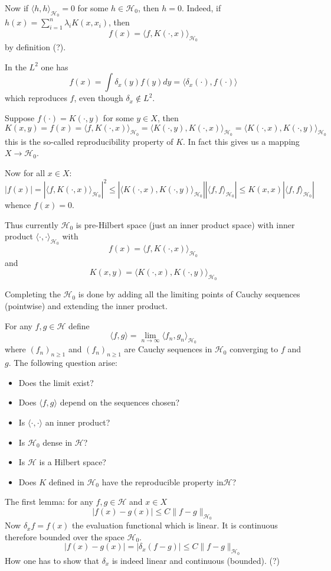 \documentclass[a4paper]{article}
\newcommand{\Hcal}{\mathcal{H}}
\begin{document}
Now if $\langle h, h \rangle_{\Hcal_0} = 0$ for some $h\in \Hcal_0$, then $h=0$.
Indeed, if $h(x) = \sum_{i=1}^n \lambda_i K(x,x_i)$, then
\[ f(x) = \langle f, K(\cdot,x) \rangle_{\Hcal_0} \]
by definition (?).

In the $L^2$ one has
\[ f(x) = \int \delta_x(y) f(y) dy = \langle \delta_x(\cdot), f(\cdot)\rangle\]
which reproduces $f$, even though $\delta_x \notin L^2$.

Suppose $f(\cdot) = K(\cdot,y)$ for some $y\in X$, then
\[
K(x,y) = f(x)
= \langle f, K(\cdot, x) \rangle_{\Hcal_0}
= \langle K(\cdot, y), K(\cdot, x) \rangle_{\Hcal_0}
= \langle K(\cdot, x), K(\cdot, y) \rangle_{\Hcal_0}
\]
this is the so-called reproducibility property of $K$. In fact this gives us a mapping
$X\to \Hcal_0$.

Now for all $x\in X$:
\[
|f(x)| = |\langle f, K(\cdot, x) \rangle_{\Hcal_0}|^2
\leq |\langle K(\cdot, x), K(\cdot, y) \rangle_{\Hcal_0}| |\langle f, f \rangle_{\Hcal_0}|
\leq K(x,x) |\langle f, f \rangle_{\Hcal_0}|
\]
whence $f(x) = 0$.

Thus currently $\Hcal_0$ is pre-Hilbert space (just an inner product space) with inner
product $\langle\cdot, \cdot\rangle_{\Hcal_0}$ with
\[ f(x) = \langle f, K(\cdot, x)\rangle_{\Hcal_0}\]
and 
\[ K(x,y) = \langle K(\cdot, x),K(\cdot, y)\rangle_{\Hcal_0}\]

Completing the $\Hcal_0$ is done by adding all the limiting points of Cauchy sequences
(pointwise) and extending the inner product.

For any $f,g\in \Hcal$ define
\[ \langle f,g \rangle = \lim_{n\to \infty} \langle f_n, g_n\rangle_{\Hcal_0} \]
where $(f_n)_{n\geq1}$ and $(f_n)_{n\geq1}$ are Cauchy sequences in $\Hcal_0$ converging
to $f$ and $g$. The following question arise: \begin{itemize}
	\item Does the limit exist? 
	\item Does $\langle f,g \rangle$ depend on the sequences chosen?
	\item Is $\langle \cdot, \cdot \rangle$ an inner product?
	\item Is $\Hcal_0$ dense in $\Hcal$?
	\item Is $\Hcal$ is a Hilbert space?
	\item Does $K$ defined in $\Hcal_0$ have the reproducible property in$\Hcal$?
\end{itemize}

The first lemma: for any $f,g\in \Hcal$ and $x\in X$
\[ |f(x) - g(x)| \leq C \|f-g\|_{\Hcal_0} \]
Now $\delta_x f = f(x)$ the evaluation functional which is linear. It is continuous therefore bounded over the space $\Hcal_0$. 
\[ |f(x) - g(x)| = |\delta_x(f-g)| \leq C\|f-g\|_{\Hcal_0} \]
How one has to show that $\delta_x$ is indeed linear and continuous (bounded). (?)
\end{document}
